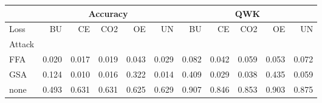 \documentclass{standalone}
\begin{document}
\begin{tabular}{|l|rrrrr|rrrrr|}
\hline
&\multicolumn{5}{c|}{Accuracy}&\multicolumn{5}{c|}{QWK}\\\hline
Loss & BU & CE & CO2 & OE & UN &  BU & CE & CO2 & OE & UN\\
Attack &  &  &  &  &  &   &  &  &  & \\
FFA & {\cellcolor[HTML]{AD0826}} \color[HTML]{F1F1F1} 0.020 & {\cellcolor[HTML]{A90426}} \color[HTML]{F1F1F1} 0.017 & {\cellcolor[HTML]{AB0626}} \color[HTML]{F1F1F1} 0.019 & {\cellcolor[HTML]{BE1827}} \color[HTML]{F1F1F1} 0.043 & {\cellcolor[HTML]{B50F26}} \color[HTML]{F1F1F1} 0.029 &  {\cellcolor[HTML]{C21C27}} \color[HTML]{F1F1F1} 0.082 & {\cellcolor[HTML]{AB0626}} \color[HTML]{F1F1F1} 0.042 & {\cellcolor[HTML]{B50F26}} \color[HTML]{F1F1F1} 0.059 & {\cellcolor[HTML]{B10B26}} \color[HTML]{F1F1F1} 0.053 & {\cellcolor[HTML]{BD1726}} \color[HTML]{F1F1F1} 0.072\\
GSA & {\cellcolor[HTML]{EF633F}} \color[HTML]{F1F1F1} 0.124 & {\cellcolor[HTML]{A50026}} \color[HTML]{F1F1F1} 0.010 & {\cellcolor[HTML]{A90426}} \color[HTML]{F1F1F1} 0.016 & {\cellcolor[HTML]{FEFFBE}} \color[HTML]{000000} 0.322 & {\cellcolor[HTML]{A70226}} \color[HTML]{F1F1F1} 0.014 &  {\cellcolor[HTML]{FEEA9B}} \color[HTML]{000000} 0.409 & {\cellcolor[HTML]{A50026}} \color[HTML]{F1F1F1} 0.029 & {\cellcolor[HTML]{A90426}} \color[HTML]{F1F1F1} 0.038 & {\cellcolor[HTML]{FFF3AC}} \color[HTML]{000000} 0.435 & {\cellcolor[HTML]{B50F26}} \color[HTML]{F1F1F1} 0.059\\
none & {\cellcolor[HTML]{73C264}} \color[HTML]{000000} 0.493 & {\cellcolor[HTML]{006837}} \color[HTML]{F1F1F1} 0.631 & {\cellcolor[HTML]{006837}} \color[HTML]{F1F1F1} 0.631 & {\cellcolor[HTML]{026C39}} \color[HTML]{F1F1F1} 0.625 & {\cellcolor[HTML]{006837}} \color[HTML]{F1F1F1} 0.629 &  {\cellcolor[HTML]{006837}} \color[HTML]{F1F1F1} 0.907 & {\cellcolor[HTML]{118848}} \color[HTML]{F1F1F1} 0.846 & {\cellcolor[HTML]{0F8446}} \color[HTML]{F1F1F1} 0.853 & {\cellcolor[HTML]{016A38}} \color[HTML]{F1F1F1} 0.903 & {\cellcolor[HTML]{097940}} \color[HTML]{F1F1F1} 0.875
\hline
\end{tabular}
\end{document}
